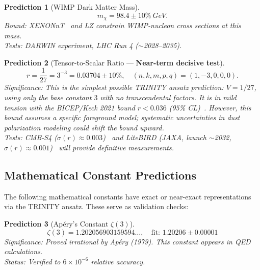 \documentclass[aps,prd,preprint,superscriptaddress,showpacs,nofootinbib,longbibliography]{revtex4-2}
\newtheorem{prediction}{Prediction}
\begin{document}
\begin{prediction}[WIMP Dark Matter Mass]
\label{pred:wimp}
\begin{equation}
m_\chi = 98.4 \pm 10\%~\si{GeV}.
\end{equation}
\textit{Bound:} XENONnT~\cite{xenonnt2023} and LZ constrain WIMP-nucleon cross sections at this mass.\\
\textit{Tests:} DARWIN experiment, LHC Run 4 ($\sim$2028--2035).
\end{prediction}

\begin{prediction}[Tensor-to-Scalar Ratio --- \textbf{Near-term decisive test}]
\label{pred:tensor}
\begin{equation}
r = \frac{1}{27} = 3^{-3} = 0.03704 \pm 10\%, \quad (n,k,m,p,q) = (1,-3,0,0,0).
\end{equation}
\textit{Significance:} This is the simplest possible TRINITY ansatz prediction: $V = 1/27$, using only the base constant $3$ with no transcendental factors. It is in mild tension with the BICEP/Keck 2021 bound $r < 0.036$ (95\% CL)~\cite{bicepkeck2021}. However, this bound assumes a specific foreground model; systematic uncertainties in dust polarization modeling could shift the bound upward.\\
\textit{Tests:} CMB-S4 ($\sigma(r) \approx 0.003$)~\cite{cmbs42019} and LiteBIRD (JAXA, launch $\sim$2032, $\sigma(r) \approx 0.001$)~\cite{litebird2023} will provide definitive measurements.
\end{prediction}

\subsection{Mathematical Constant Predictions}

The following mathematical constants have exact or near-exact representations via the TRINITY ansatz. These serve as validation checks:

\begin{prediction}[Apéry's Constant $\zeta(3)$]
\label{pred:zeta3}
\begin{equation}
\zeta(3) = 1.202056903159594\ldots, \quad \text{fit: } 1.20206 \pm 0.00001
\end{equation}
\textit{Significance:} Proved irrational by Apéry (1979). This constant appears in QED calculations.\\
\textit{Status:} Verified to $6\times10^{-6}$ relative accuracy.
\end{prediction}
\end{document}
